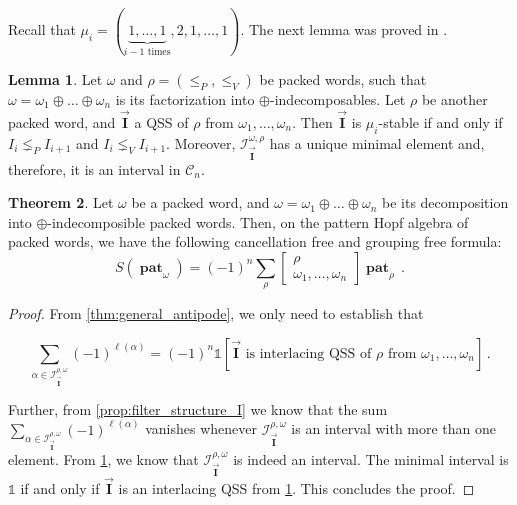 \documentclass[submission]{FPSAC2023}
\theoremstyle{definition}
\newtheorem{thm}{Theorem}[section]
\newtheorem{lm}[thm]{Lemma}
\newcommand{\III}{\vec{\mathbf{I}}}
\DeclareMathOperator{\pat}{\mathbf{pat}}
\begin{document}
Recall that $\mu_i = (\underbrace{1, \dots , 1}_\text{$i-1$ times}, 2, 1, \dots, 1)$. The next lemma was proved in \cite[Lemma 7.2 and Lemma 7.3]{PV2022}.


\begin{lm}\label{lm:QSSpackedWords}
Let $\omega$ and $\rho = (\leq_P, \leq_V)$ be packed words, such that $\omega = \omega_1 \oplus \dots \oplus \omega_n$ is its factorization into $\oplus$-indecomposables. Let $\rho$ be another packed word, and $\III$ a QSS of $\rho$ from $\omega_1, \dots , \omega_n$. Then $\III$ is $\mu_i$-stable if and only if $I_i \lneq_P I_{i+1}$ and $I_i \lneq_V I_{i+1}$. Moreover, $\mathcal I^{\omega, \rho}_{\III}$ has a unique minimal element and, therefore, it is an interval in $\mathcal C_n$.
\end{lm}

\begin{thm}\label{thm:antipode_packed}
Let $\omega $ be a packed word, and $\omega = \omega_1 \oplus \dots \oplus \omega_n$ be its decomposition into $\oplus$-indecomposible packed words.
Then, on the pattern Hopf algebra of packed words, we have the following cancellation free and grouping free formula:
$$S(\pat_{\omega}) = (-1)^n  \sum_{\rho}
\begin{bmatrix}
\rho\\
\omega_1, \dots, \omega_n
\end{bmatrix}
 \pat_{\rho}  \, .$$
\end{thm}


\begin{proof}
From \cref{thm:general_antipode}, we only need to establish that

\begin{equation}\label{eq:packed_alternating_sum}
\sum_{\alpha\in \mathcal I^{\rho, \omega}_{\III}} (-1)^{\ell (\alpha)} = (-1)^n \mathbb{1}[\III \text{ is interlacing QSS of $\rho$ from } \omega_1, \dots, \omega_n]\, .      
\end{equation}


Further, from \cref{prop:filter_structure_I} we know that the sum $\sum_{\alpha\in \mathcal I^{\rho, \omega}_{\III}}  (-1)^{\ell (\alpha)} $ vanishes whenever $\mathcal I^{\rho, \omega}_{\III}$ is an interval with more than one element.
From \cref{lm:QSSpackedWords}, we know that $\mathcal I^{\rho, \omega}_{\III}$ is indeed an interval.
The minimal interval is $\mathbb{1}$ if and only if $\III$ is an interlacing QSS from \cref{lm:QSSpackedWords}.
This concludes the proof.
\end{proof}
\end{document}
